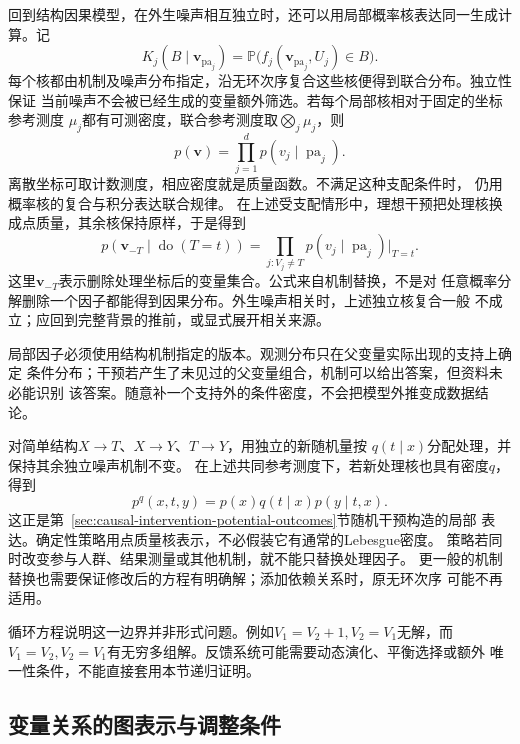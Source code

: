 回到结构因果模型，在外生噪声相互独立时，还可以用局部概率核表达同一生成计算。记
\[
  K_j(B\mid\bm v_{\operatorname{pa}_j})
  =
  \mathbb P\bigl(f_j(\bm v_{\operatorname{pa}_j},U_j)\in B\bigr).
\]
每个核都由机制及噪声分布指定，沿无环次序复合这些核便得到联合分布。独立性保证
当前噪声不会被已经生成的变量额外筛选。若每个局部核相对于固定的坐标参考测度
\(\mu_j\)都有可测密度，联合参考测度取\(\bigotimes_j\mu_j\)，则
\[
  p(\bm v)=\prod_{j=1}^d p(v_j\mid\operatorname{pa}_j).
\]
离散坐标可取计数测度，相应密度就是质量函数。不满足这种支配条件时，
仍用概率核的复合与积分表达联合规律。
在上述受支配情形中，理想干预把处理核换成点质量，其余核保持原样，于是得到
\begin{equation}
  p(\bm v_{-T}\mid\operatorname{do}(T=t))
  =
  \prod_{j:V_j\ne T}
  p(v_j\mid\operatorname{pa}_j)\big|_{T=t}.
  \label{eq:causal-truncated-factorization}
\end{equation}
这里\(\bm v_{-T}\)表示删除处理坐标后的变量集合。公式来自机制替换，不是对
任意概率分解删除一个因子都能得到因果分布。外生噪声相关时，上述独立核复合一般
不成立；应回到完整背景的推前，或显式展开相关来源。

局部因子必须使用结构机制指定的版本。观测分布只在父变量实际出现的支持上确定
条件分布；干预若产生了未见过的父变量组合，机制可以给出答案，但资料未必能识别
该答案。随意补一个支持外的条件密度，不会把模型外推变成数据结论。

对简单结构\(X\to T\)、\(X\to Y\)、\(T\to Y\)，用独立的新随机量按
\(q(t\mid x)\)分配处理，并保持其余独立噪声机制不变。
在上述共同参考测度下，若新处理核也具有密度\(q\)，得到
\begin{equation}
  p^q(x,t,y)=p(x)q(t\mid x)p(y\mid t,x).
  \label{eq:causal-stochastic-intervention}
\end{equation}
这正是第~\ref{sec:causal-intervention-potential-outcomes}节随机干预构造的局部
表达。确定性策略用点质量核表示，不必假装它有通常的Lebesgue密度。
策略若同时改变参与人群、结果测量或其他机制，就不能只替换处理因子。
更一般的机制替换也需要保证修改后的方程有明确解；添加依赖关系时，原无环次序
可能不再适用。

循环方程说明这一边界并非形式问题。例如\(V_1=V_2+1,V_2=V_1\)无解，而
\(V_1=V_2,V_2=V_1\)有无穷多组解。反馈系统可能需要动态演化、平衡选择或额外
唯一性条件，不能直接套用本节递归证明。

\subsection{变量关系的图表示与调整条件}
\label{sec:causal-graph-adjustment}

